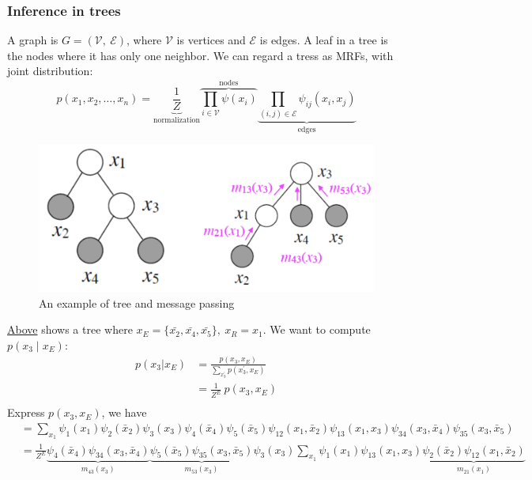 \subsubsection*{Inference in trees}
A graph is $G=(\mathcal{V},\:\mathcal{E})$, where $\mathcal{V}$ is vertices and $\mathcal{E}$ is edges. A leaf in a tree is the nodes where it has only one neighbor. We can regard a tress as MRFs, with joint distribution:
$$p\left(x_1, x_2, \ldots, x_n\right)=\underbrace{\frac{1}{Z}}_{\text{normalization}}\overbrace{\prod_{i \in \mathcal{V}} \psi\left(x_i\right)}^{\text{nodes}}\underbrace{\prod_{(i, j) \in \mathcal{E}} \psi_{i j}\left(x_i, x_j\right)}_{\text{edges}}$$
\begin{example}
    \begin{figure}[H]
        \centering
        \includegraphics[width = .6\linewidth]{figures/section4/figure_4_1.png}
        \caption{An example of tree and message passing}
        \label{fig:tree}
    \end{figure}
    \hyperref[fig:tree]{Above} shows a tree where $x_E=\{\bar{x_2},\bar{x_4},\bar{x_5}\},\:x_R=x_1$. We want to compute $p(x_3\mid x_E)$:
    \begin{align*}
        p(x_3|x_E)&=\frac{p\left(x_3, x_E\right)}{\sum_{x_3^{\prime}} p\left(x_3^{\prime}, x_E\right)}\\
        &=\frac{1}{Z^E}\:p(x_3,x_E)\\
    \end{align*}
    Express $p(x_3,x_E)$, we have
    \begin{align*}
        &=\sum_{x_1} \psi_1\left(x_1\right) \psi_2\left(\bar{x}_2\right) \psi_3\left(x_3\right) \psi_4\left(\bar{x}_4\right) \psi_5\left(\bar{x}_5\right) \psi_{12}\left(x_1, \bar{x}_2\right) \psi_{13}\left(x_1, x_3\right) \psi_{34}\left(x_3, \bar{x}_4\right) \psi_{35}\left(x_3, \bar{x}_5\right)\\
        &=\frac{1}{Z^E} \underbrace{\psi_4\left(\bar{x}_4\right) \psi_{34}\left(x_3, \bar{x}_4\right)}_{m_{43}\left(x_3\right)} \underbrace{\psi_5\left(\bar{x}_5\right) \psi_{35}\left(x_3, \bar{x}_5\right)}_{m_{53}\left(x_3\right)} \psi_3\left(x_3\right) \sum_{x_1} \psi_1\left(x_1\right) \psi_{13}\left(x_1, x_3\right) \underbrace{\psi_2\left(\bar{x}_2\right) \psi_{12}\left(x_1, \bar{x}_2\right)}_{m_{21}\left(x_1\right)} \\

\end{align*}
\end{example}
